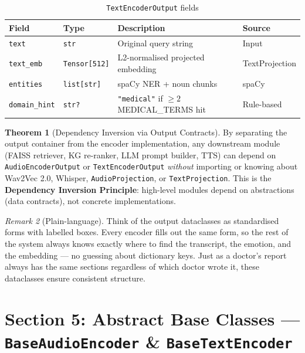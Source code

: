 \documentclass[12pt,a4paper]{article}
\theoremstyle{definition}
\newtheorem{theorem}{Theorem}[section]
\theoremstyle{remark}
\newtheorem{remark}[theorem]{Remark}
\begin{document}
\begin{table}[H]
\centering
\caption{\texttt{TextEncoderOutput} fields}
\begin{tabularx}{\textwidth}{llXl}
\toprule
Field & Type & Description & Source \\
\midrule
\texttt{text}        & \texttt{str} & Original query string & Input \\
\texttt{text\_emb}   & \texttt{Tensor[512]} & L2-normalised projected embedding & TextProjection \\
\texttt{entities}    & \texttt{list[str]} & spaCy NER + noun chunks & spaCy \\
\texttt{domain\_hint}& \texttt{str?} & \texttt{"medical"} if $\geq 2$ MEDICAL\_TERMS hit & Rule-based \\
\bottomrule
\end{tabularx}
\end{table}

\begin{theorem}[Dependency Inversion via Output Contracts]
By separating the output container from the encoder implementation,
any downstream module (FAISS retriever, KG re-ranker, LLM prompt builder, TTS)
can depend on \texttt{AudioEncoderOutput} or \texttt{TextEncoderOutput}
\emph{without} importing or knowing about Wav2Vec 2.0, Whisper,
\texttt{AudioProjection}, or \texttt{TextProjection}.
This is the \textbf{Dependency Inversion Principle}: high-level modules
depend on abstractions (data contracts), not concrete implementations.
\end{theorem}

\begin{remark}[Plain-language]
Think of the output dataclasses as standardised forms with labelled boxes.
Every encoder fills out the same form, so the rest of the system always
knows exactly where to find the transcript, the emotion, and the embedding —
no guessing about dictionary keys.
Just as a doctor's report always has the same sections regardless of which
doctor wrote it, these dataclasses ensure consistent structure.
\end{remark}

\section{Section 5: Abstract Base Classes — \texttt{BaseAudioEncoder} \& \texttt{BaseTextEncoder}}
\end{document}
